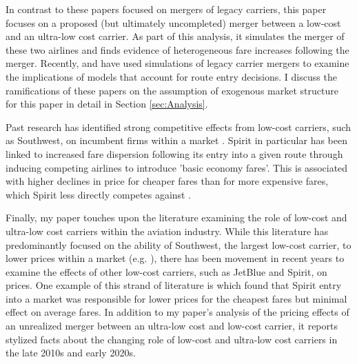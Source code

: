 \documentclass{article}
\begin{document}
    In contrast to these papers focused on mergers of legacy carriers, this paper focuses on a proposed (but ultimately uncompleted) merger between a low-cost and an ultra-low cost carrier. As part of this analysis, it simulates the merger of these two airlines and finds evidence of heterogeneous fare increases following the merger. Recently, \citet{ciliberto_market_2021} and \citet{li_repositioning_2022} have used simulations of legacy carrier mergers to examine the implications of models that account for route entry decisions. I discuss the ramifications of these papers on the assumption of exogenous market structure for this paper in detail in Section \ref{sec:Analysis}. 

    Past research has identified strong competitive effects from low-cost carriers, such as Southwest, on incumbent firms within a market \citep{morrison_actual_2001, goolsbee_how_2008}. Spirit in particular has been linked to increased fare dispersion following its entry into a given route through inducing competing airlines to introduce 'basic economy fares'. This is associated with higher declines in price for cheaper fares than for more expensive fares, which Spirit less directly competes against \citep{shrago_spirit_2024}.

    
	Finally, my paper touches upon the literature examining the role of low-cost and ultra-low cost carriers within the aviation industry. While this literature has predominantly focused on the ability of Southwest, the largest low-cost carrier, to lower prices within a market (e.g. \citet{windle_short_1995, morrison_actual_2001,  goolsbee_how_2008}), there has been movement in recent years to examine the effects of other low-cost carriers, such as JetBlue and Spirit, on prices. One example of this strand of literature is \citet{shrago_spirit_2024} which found that Spirit entry into a market was responsible for lower prices for the cheapest fares but minimal effect on average fares. In addition to my paper's analysis of the pricing effects of an unrealized merger between an ultra-low cost and low-cost carrier, it reports stylized facts about the changing role of low-cost and ultra-low cost carriers in the late 2010s and early 2020s.  
\end{document}

